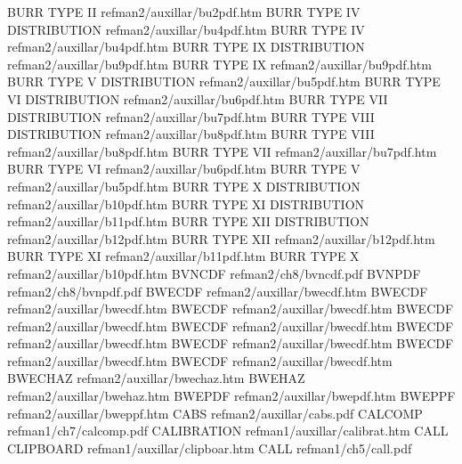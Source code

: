 BURR TYPE II                            refman2/auxillar/bu2pdf.htm
BURR TYPE IV DISTRIBUTION               refman2/auxillar/bu4pdf.htm
BURR TYPE IV                            refman2/auxillar/bu4pdf.htm
BURR TYPE IX DISTRIBUTION               refman2/auxillar/bu9pdf.htm
BURR TYPE IX                            refman2/auxillar/bu9pdf.htm
BURR TYPE V DISTRIBUTION                refman2/auxillar/bu5pdf.htm
BURR TYPE VI DISTRIBUTION               refman2/auxillar/bu6pdf.htm
BURR TYPE VII DISTRIBUTION              refman2/auxillar/bu7pdf.htm
BURR TYPE VIII DISTRIBUTION             refman2/auxillar/bu8pdf.htm
BURR TYPE VIII                          refman2/auxillar/bu8pdf.htm
BURR TYPE VII                           refman2/auxillar/bu7pdf.htm
BURR TYPE VI                            refman2/auxillar/bu6pdf.htm
BURR TYPE V                             refman2/auxillar/bu5pdf.htm
BURR TYPE X DISTRIBUTION                refman2/auxillar/b10pdf.htm
BURR TYPE XI DISTRIBUTION               refman2/auxillar/b11pdf.htm
BURR TYPE XII DISTRIBUTION              refman2/auxillar/b12pdf.htm
BURR TYPE XII                           refman2/auxillar/b12pdf.htm
BURR TYPE XI                            refman2/auxillar/b11pdf.htm
BURR TYPE X                             refman2/auxillar/b10pdf.htm
BVNCDF                                  refman2/ch8/bvncdf.pdf
BVNPDF                                  refman2/ch8/bvnpdf.pdf
BWECDF                                  refman2/auxillar/bwecdf.htm
BWECDF                                  refman2/auxillar/bwecdf.htm
BWECDF                                  refman2/auxillar/bwecdf.htm
BWECDF                                  refman2/auxillar/bwecdf.htm
BWECDF                                  refman2/auxillar/bwecdf.htm
BWECDF                                  refman2/auxillar/bwecdf.htm
BWECDF                                  refman2/auxillar/bwecdf.htm
BWECDF                                  refman2/auxillar/bwecdf.htm
BWECDF                                  refman2/auxillar/bwecdf.htm
BWECHAZ                                 refman2/auxillar/bwechaz.htm
BWEHAZ                                  refman2/auxillar/bwehaz.htm
BWEPDF                                  refman2/auxillar/bwepdf.htm
BWEPPF                                  refman2/auxillar/bweppf.htm
CABS                                    refman2/auxillar/cabs.pdf
CALCOMP                                 refman1/ch7/calcomp.pdf
CALIBRATION                             refman1/auxillar/calibrat.htm
CALL CLIPBOARD                          refman1/auxillar/clipboar.htm
CALL                                    refman1/ch5/call.pdf
